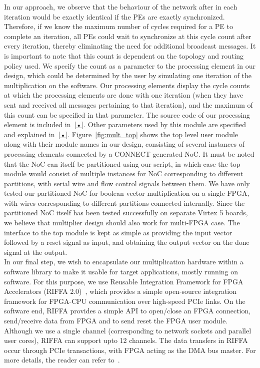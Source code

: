 \documentclass[conference, 9pt]{IEEEtran}
\begin{document}
In our approach, we observe that the behaviour of the network after in each iteration would be exactly identical if the PEs are exactly synchronized. Therefore, if we know the maximum number of cycles required for a PE to complete an iteration, all PEs could wait to synchronize at this cycle count after every iteration, thereby eliminating the need for additional broadcast messages. It is important to note that this count is dependent on the topology and routing policy used. We specify the count as a parameter to the processing element in our design, which could be determined by the user by simulating one iteration of the multiplication on the software. Our processing elements display the cycle counts at which the processing elements are done with one iteration (when they have sent and received all messages pertaining to that iteration), and the maximum of this count can be specified in that parameter. The source code of our processing element is included in~\ref{•}. Other parameters used by this module are 
specified and explained in~\ref{•}. Figure~\ref{fig:mult_top} shows the top level user module along with their module names in our design, consisting of several instances of processing elements connected by a CONNECT generated NoC. It must be noted that the NoC can itself be partitioned using our script, in which case the top module would consist of multiple instances for NoC corresponding to different partitions, with serial wire and flow control signals between them. We have only tested our partitioned NoC for boolean vector multiplication on a single FPGA, with wires corresponding to different partitions connected internally. Since the partitioned NoC itself has been tested successfully on separate Virtex 5 boards, we believe that multiplier design should also work for multi-FPGA case. The interface to the top module is kept as simple as providing the input vector followed by a reset signal as input, and obtaining the output vector on the done signal at the output.\\

In our final step, we wish to encapsulate our multiplication hardware within a software library to make it usable for target applications, mostly running on software. For this purpose, we use Reusable Integration Framework for FPGA Accelerators (RIFFA 2.0)~\cite{jacobsen2013riffa}, which provides a simple open-source integration framework for FPGA-CPU communication over high-speed PCIe links. On the software end, RIFFA provides a simple API to open/close an FPGA connection, send/receive data from FPGA and to send reset the FPGA user module. Although we use a single channel (corresponding to network sockets and parallel user cores), RIFFA can support upto 12 channels. The data transfers in RIFFA occur through PCIe transactions, with FPGA acting as the DMA bus master. For more details, the reader can refer to~\cite{jacobsen2013riffa}. \\
\end{document}

